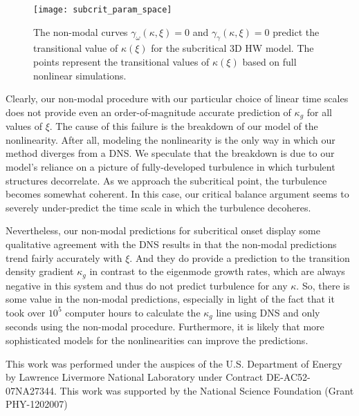 \documentclass[twocolumn,showkeys,superscriptaddress]{revtex4}
\begin{document}
\begin{figure}
\centerline{\texttt{[image: subcrit\_param\_space]}}
\caption{The non-modal curves $\gamma_{\omega}(\kappa,\xi) = 0$ and $\gamma_{\gamma}(\kappa,\xi) = 0$ predict the transitional value of $\kappa(\xi)$ for the subcritical 3D HW model. The points represent the
transitional values of $\kappa(\xi)$ based on full nonlinear simulations.}
\label{subcrit_param_space}
\end{figure}

Clearly, our non-modal procedure with our particular choice of linear time scales does not provide even an order-of-magnitude accurate prediction of $\kappa_g$ for all values of $\xi$.
The cause of this failure is the breakdown of our model of the nonlinearity. After all, modeling the nonlinearity is the only way in which our method diverges from a DNS.
We speculate that the breakdown is due to our model's reliance on a picture of fully-developed turbulence in which turbulent structures decorrelate.
As we approach the subcritical point, the turbulence becomes somewhat coherent. In this case, our critical balance argument seems to severely under-predict the time scale in which the turbulence decoheres.

Nevertheless, our non-modal predictions for subcritical onset display some qualitative agreement with the DNS results in that the non-modal predictions trend fairly accurately with $\xi$. 
And they do provide a prediction to the transition density gradient $\kappa_g$ in contrast to the eigenmode growth rates, which are always negative in this system and thus do not predict turbulence for any $\kappa$.
So, there is some value in the non-modal predictions, especially in light of the fact that it took over $10^5$ computer hours to calculate the $\kappa_g$ line using DNS and only seconds using the non-modal procedure.
Furthermore, it is likely that more sophisticated models for the nonlinearities can improve the predictions.


\begin{acknowledgments}
This work was performed under the auspices of the U.S. Department of Energy by Lawrence Livermore National Laboratory under Contract DE-AC52-07NA27344.
This work was supported by the National Science Foundation (Grant PHY-1202007)
\end{acknowledgments}


%
%
\end{document}
